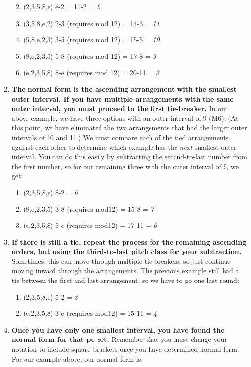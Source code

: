 \documentclass{book}
\providecommand{\tightlist}{%
  \setlength{\itemsep}{0pt}\setlength{\parskip}{0pt}}
\begin{document}
\begin{enumerate}
  \begin{enumerate}
  \def\labelenumii{\arabic{enumii}.}
  \tightlist
  \item
    (2,3,5,8,e) \textbar{} e-2 = 11-2 = \emph{9}
  \item
    (3,5,8,e,2) \textbar{} 2-3 (requires mod 12) = 14-3 = \emph{11}
  \item
    (5,8,e,2,3) \textbar{} 3-5 (requires mod 12) = 15-5 = \emph{10}
  \item
    (8,e,2,3,5) \textbar{} 5-8 (requires mod 12) = 17-8 = \emph{9}
  \item
    (e,2,3,5,8) \textbar{} 8-e (requires mod 12) = 20-11 = \emph{9}
  \end{enumerate}
\item
  \textbf{The normal form is the ascending arrangement with the smallest outer
  interval. If you have multiple arrangements with the same outer interval,
  you must proceed to the first tie-breaker.} In our above example, we have
  three options with an outer interval of 9 (M6). (At this point, we have
  eliminated the two arrangements that had the larger outer intervals of 10
  and 11.) We must compare each of the tied arrangements against each other to
  determine which example has the \emph{next} smallest outer interval. You can
  do this easily by subtracting the second-to-last number from the first
  number, so for our remaining three with the outer interval of 9, we get:

  \begin{enumerate}
  \def\labelenumii{\arabic{enumii}.}
  \tightlist
  \item
    (2,3,5,8,e) \textbar{} 8-2 = \emph{6}
  \item
    (8,e,2,3,5) \textbar{} 3-8 (requires mod12) = 15-8 = \emph{7}
  \item
    (e,2,3,5,8) \textbar{} 5-e (requires mod12) = 17-11 = \emph{6}
  \end{enumerate}
\item
  \textbf{If there is still a tie, repeat the process for the remaining
  ascending orders, but using the third-to-last pitch class for your
  subtraction.} Sometimes, this can move through multiple tie-breakers, so
  just continue moving inward through the arrangements. The previous example
  still had a tie between the first and last arrangement, so we have to go one
  last round:

  \begin{enumerate}
  \def\labelenumii{\arabic{enumii}.}
  \tightlist
  \item
    (2,3,5,8,e) \textbar{} 5-2 = \emph{3}
  \item
    (e,2,3,5,8) \textbar{} 3-e (requires mod12) = 15-11 = \emph{4}
  \end{enumerate}
\item
  \textbf{Once you have only one smallest interval, you have found the normal
  form for that pc set.} Remember that you must change your notation to
  include square brackets once you have determined normal form. For our
  example above, our normal form is:


\end{enumerate}
\end{document}
